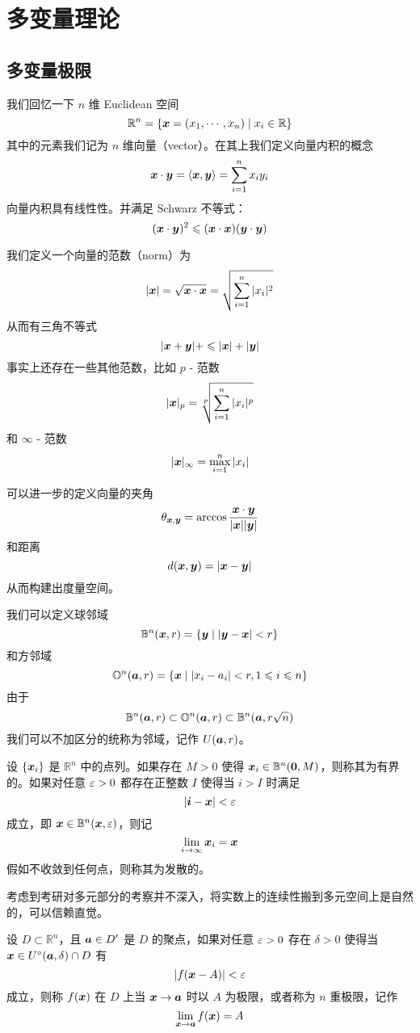 \chapter{多变量理论}

\section{多变量极限}

我们回忆一下 $n$ 维 Euclidean 空间
\[ \mathbb{R}^n = \{\boldsymbol{x} = (x_1, \cdots, x_n) \mid x_i \in \mathbb{R} \} \]
其中的元素我们记为 $n$ 维向量（vector）。在其上我们定义向量内积的概念
\[ \boldsymbol{x} \cdot \boldsymbol{y} = \langle \boldsymbol{x}, \boldsymbol{y} \rangle= \sum_{i=1}^{n} x_i y_i \]
向量内积具有线性性。并满足 Schwarz 不等式：
\[ (\boldsymbol{x} \cdot \boldsymbol{y})^2 \leqslant (\boldsymbol{x} \cdot \boldsymbol{x})(\boldsymbol{y} \cdot \boldsymbol{y}) \]

我们定义一个向量的范数（norm）为
\[ |\boldsymbol{x}| = \sqrt{\boldsymbol{x} \cdot \boldsymbol{x}} = \sqrt{\sum_{i=1}^{n} |x_i|^2}  \]
从而有三角不等式
\[ |\boldsymbol{x} + \boldsymbol{y}| +\leqslant |\boldsymbol{x}| + |\boldsymbol{y}| \]
事实上还存在一些其他范数，比如 $p$ - 范数
\[ |\boldsymbol{x}|_p = \sqrt[p]{\sum_{i=1}^{n} |x_i|^p}  \]
和 $\infty$ - 范数
\[ |\boldsymbol{x}|_\infty = \max_{i=1}^{n} |x_i|  \]

可以进一步的定义向量的夹角
\[ \theta_{\boldsymbol{x}, \boldsymbol{y}} = \arccos\frac{\boldsymbol{x} \cdot \boldsymbol{y}}{|\boldsymbol{x}||\boldsymbol{y}|} \]
和距离
\[ d(\boldsymbol{x}, \boldsymbol{y}) = |\boldsymbol{x}-\boldsymbol{y}| \]
从而构建出度量空间。

我们可以定义球邻域
\[ \mathbb{B}^n(\boldsymbol{x}, r) = \{ \boldsymbol{y} \mid |\boldsymbol{y}-\boldsymbol{x}| < r \} \]
和方邻域
\[ \mathbb{O}^n(\boldsymbol{a}, r) = \{ \boldsymbol{x} \mid |x_i - a_i| < r, 1 \leqslant i \leqslant n \} \]
由于
\[ \mathbb{B}^n(\boldsymbol{a}, r) \subset \mathbb{O}^n(\boldsymbol{a}, r) \subset \mathbb{B}^n(\boldsymbol{a}, r\sqrt{n})  \]
我们可以不加区分的统称为邻域，记作 $U(\boldsymbol{a}, r)$。

\begin{definition}
	设 $\{\boldsymbol{x}_i\}$ 是 $\mathbb{R}^n$ 中的点列。如果存在 $M > 0$ 使得 $\boldsymbol{x}_i \in \mathbb{B}^n(\boldsymbol{0}, M)$，则称其为有界的。如果对任意 $\varepsilon > 0$ 都存在正整数 $I$ 使得当 $i > I$ 时满足
	\[ |\boldsymbol{i} - \boldsymbol{x}| < \varepsilon \]
	成立，即 $\boldsymbol{x} \in \mathbb{B}^n(\boldsymbol{x}, \varepsilon)$，则记
	\[ \lim_{i \to \infty} \boldsymbol{x}_i = \boldsymbol{x} \]
	假如不收敛到任何点，则称其为发散的。
\end{definition}

考虑到考研对多元部分的考察并不深入，将实数上的连续性搬到多元空间上是自然的，可以信赖直觉。

\begin{definition}
	设 $D \subset \mathbb{R}^n$，且 $\boldsymbol{a} \in D'$ 是 $D$ 的聚点，如果对任意 $\varepsilon > 0$ 存在 $\delta > 0$ 使得当 $\boldsymbol{x} \in U^{\circ}(\boldsymbol{a}, \delta) \cap D$ 有
	\[ |f(\boldsymbol{x} - A)| < \varepsilon \]
	成立，则称 $f(\boldsymbol{x})$ 在 $D$ 上当 $\boldsymbol{x} \to \boldsymbol{a}$ 时以 $A$ 为极限，或者称为 $n$ 重极限，记作
	\[ \lim_{\boldsymbol{x} \to \boldsymbol{a}} f(\boldsymbol{x}) = A \]
\end{definition}

